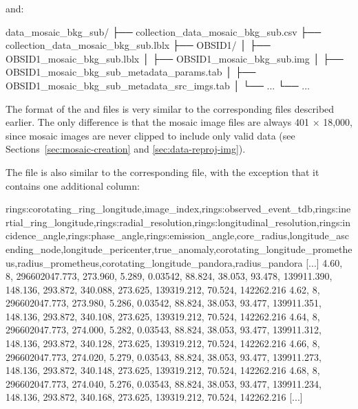 and:

\begin{CodeBlock}
data_mosaic_bkg_sub/
├── collection_data_mosaic_bkg_sub.csv
├── collection_data_mosaic_bkg_sub.lblx
├── OBSID1/
│   ├── OBSID1_mosaic_bkg_sub.lblx
│   ├── OBSID1_mosaic_bkg_sub.img
│   ├── OBSID1_mosaic_bkg_sub_metadata_params.tab
│   ├── OBSID1_mosaic_bkg_sub_metadata_src_imgs.tab
│   └── ...
└── ...
\end{CodeBlock}

The format of the  and  files is very similar to the corresponding  files described earlier. The only difference is that the mosaic image files are always 401 × 18,000, since mosaic images are never clipped to include only valid data (see Sections~\ref{sec:mosaic-creation} and \ref{sec:data-reproj-img}).

The  file is also similar to the corresponding  file, with the exception that it contains one additional column:

\begin{CodeBlock}[fontsize=\scriptsize]
rings:corotating_ring_longitude,image_index,rings:observed_event_tdb,rings:inertial_ring_longitude,rings:radial_resolution,rings:longitudinal_resolution,rings:incidence_angle,rings:phase_angle,rings:emission_angle,core_radius,longitude_ascending_node,longitude_pericenter,true_anomaly,corotating_longitude_prometheus,radius_prometheus,corotating_longitude_pandora,radius_pandora
[...]
  4.60,    8, 296602047.773, 273.960,    5.289,  0.03542,  88.824,  38.053,  93.478, 139911.390, 148.136, 293.872, 340.088, 273.625, 139319.212,  70.524, 142262.216
  4.62,    8, 296602047.773, 273.980,    5.286,  0.03542,  88.824,  38.053,  93.477, 139911.351, 148.136, 293.872, 340.108, 273.625, 139319.212,  70.524, 142262.216
  4.64,    8, 296602047.773, 274.000,    5.282,  0.03543,  88.824,  38.053,  93.477, 139911.312, 148.136, 293.872, 340.128, 273.625, 139319.212,  70.524, 142262.216
  4.66,    8, 296602047.773, 274.020,    5.279,  0.03543,  88.824,  38.053,  93.477, 139911.273, 148.136, 293.872, 340.148, 273.625, 139319.212,  70.524, 142262.216
  4.68,    8, 296602047.773, 274.040,    5.276,  0.03543,  88.824,  38.053,  93.477, 139911.234, 148.136, 293.872, 340.168, 273.625, 139319.212,  70.524, 142262.216
[...]
\end{CodeBlock}

